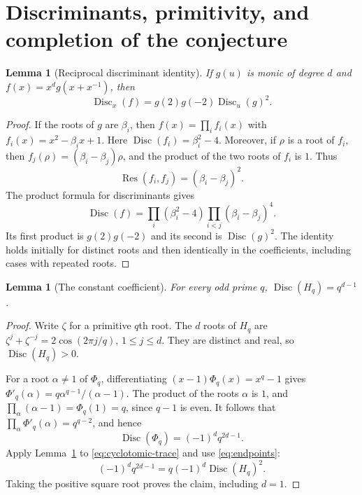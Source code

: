 \documentclass[11pt,a4paper]{article}
\newtheorem{lemma}[theorem]{Lemma}
\theoremstyle{definition}
\theoremstyle{remark}
\newcommand{\Disc}{\operatorname{Disc}}
\newcommand{\Res}{\operatorname{Res}}
\begin{document}
\section{Discriminants, primitivity, and completion of the conjecture}
\label{sec:completion}

\begin{lemma}[Reciprocal discriminant identity]\label{lem:reciprocal-disc}
If $g(u)$ is monic of degree $d$ and $f(x)=x^dg(x+x^{-1})$, then
\begin{equation}\label{eq:reciprocal-disc}
 \Disc_x(f)=g(2)g(-2)\Disc_u(g)^2.
\end{equation}
\end{lemma}

\begin{proof}
If the roots of $g$ are $\beta_i$, then
$f(x)=\prod_i f_i(x)$ with $f_i(x)=x^2-\beta_i x+1$.
Here $\Disc(f_i)=\beta_i^2-4$. Moreover, if $\rho$ is a root
of $f_i$, then $f_j(\rho)=(\beta_i-\beta_j)\rho$, and the
product of the two roots of $f_i$ is $1$. Thus
\[
 \Res(f_i,f_j)=(\beta_i-\beta_j)^2.
\]
The product formula for discriminants gives
\[
 \Disc(f)=\prod_i(\beta_i^2-4)
 \prod_{i<j}(\beta_i-\beta_j)^4.
\]
Its first product is $g(2)g(-2)$ and its second is $\Disc(g)^2$.
The identity holds initially for distinct roots and then identically
in the coefficients, including cases with repeated roots.
\end{proof}

\begin{lemma}[The constant coefficient]\label{lem:constant}
For every odd prime $q$, $\Disc(H_q)=q^{d-1}$.
\end{lemma}

\begin{proof}
Write $\zeta$ for a primitive $q$th root. The $d$ roots of $H_q$
are $\zeta^j+\zeta^{-j}=2\cos(2\pi j/q)$, $1\le j\le d$.
They are distinct and real, so $\Disc(H_q)>0$.

For a root $\alpha\ne1$ of $\Phi_q$, differentiating
$(x-1)\Phi_q(x)=x^q-1$ gives
$\Phi'_q(\alpha)=q\alpha^{q-1}/(\alpha-1)$.
The product of the roots $\alpha$ is $1$, and
$\prod_\alpha(\alpha-1)=\Phi_q(1)=q$, since $q-1$ is even.
It follows that $\prod_\alpha\Phi'_q(\alpha)=q^{q-2}$, and hence
\[
 \Disc(\Phi_q)=(-1)^dq^{2d-1}.
\]
Apply Lemma~\ref{lem:reciprocal-disc} to
\eqref{eq:cyclotomic-trace} and use \eqref{eq:endpoints}:
\[
 (-1)^dq^{2d-1}=q(-1)^d\Disc(H_q)^2.
\]
Taking the positive square root proves the claim, including $d=1$.
\end{proof}
\end{document}
